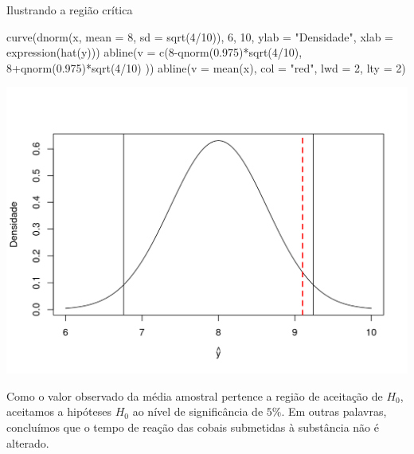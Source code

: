 \documentclass[
  10pt,
  a4paper]{book}
\newenvironment{Shaded}{\begin{snugshade}}{\end{snugshade}}
\newcommand{\AttributeTok}[1]{\textcolor[rgb]{0.77,0.63,0.00}{#1}}
\newcommand{\DecValTok}[1]{\textcolor[rgb]{0.00,0.00,0.81}{#1}}
\newcommand{\FloatTok}[1]{\textcolor[rgb]{0.00,0.00,0.81}{#1}}
\newcommand{\FunctionTok}[1]{\textcolor[rgb]{0.00,0.00,0.00}{#1}}
\newcommand{\NormalTok}[1]{#1}
\newcommand{\SpecialCharTok}[1]{\textcolor[rgb]{0.00,0.00,0.00}{#1}}
\newcommand{\StringTok}[1]{\textcolor[rgb]{0.31,0.60,0.02}{#1}}
\begin{document}
Ilustrando a região crítica

\begin{Shaded}
\begin{Highlighting}[]
\FunctionTok{curve}\NormalTok{(}\FunctionTok{dnorm}\NormalTok{(x, }\AttributeTok{mean =} \DecValTok{8}\NormalTok{, }\AttributeTok{sd =} \FunctionTok{sqrt}\NormalTok{(}\DecValTok{4}\SpecialCharTok{/}\DecValTok{10}\NormalTok{)), }\DecValTok{6}\NormalTok{, }\DecValTok{10}\NormalTok{, }
      \AttributeTok{ylab =} \StringTok{"Densidade"}\NormalTok{, }\AttributeTok{xlab =} \FunctionTok{expression}\NormalTok{(}\FunctionTok{hat}\NormalTok{(y)))}
\FunctionTok{abline}\NormalTok{(}\AttributeTok{v =} \FunctionTok{c}\NormalTok{(}\DecValTok{8}\SpecialCharTok{{-}}\FunctionTok{qnorm}\NormalTok{(}\FloatTok{0.975}\NormalTok{)}\SpecialCharTok{*}\FunctionTok{sqrt}\NormalTok{(}\DecValTok{4}\SpecialCharTok{/}\DecValTok{10}\NormalTok{), }\DecValTok{8}\SpecialCharTok{+}\FunctionTok{qnorm}\NormalTok{(}\FloatTok{0.975}\NormalTok{)}\SpecialCharTok{*}\FunctionTok{sqrt}\NormalTok{(}\DecValTok{4}\SpecialCharTok{/}\DecValTok{10}\NormalTok{) ))}
\FunctionTok{abline}\NormalTok{(}\AttributeTok{v =} \FunctionTok{mean}\NormalTok{(x), }\AttributeTok{col =} \StringTok{"red"}\NormalTok{, }\AttributeTok{lwd =} \DecValTok{2}\NormalTok{, }\AttributeTok{lty =} \DecValTok{2}\NormalTok{)}
\end{Highlighting}
\end{Shaded}

\begin{center}\includegraphics{figures/unnamed-chunk-392-1} \end{center}

Como o valor observado da média amostral pertence a região de aceitação de \(H_0\), aceitamos a hipóteses \(H_0\) ao nível de significância de \(5\%\). Em outras palavras, concluímos que o tempo de reação das cobais submetidas à substância não é alterado.
\end{document}
